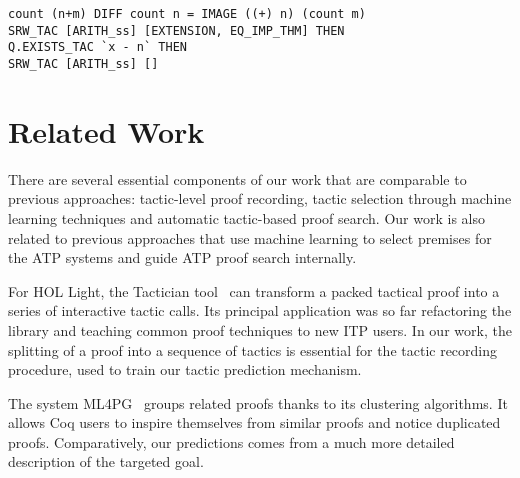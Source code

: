 \documentclass[runningheads,a4paper,draft]{svjour3}
\def\hollight{\textsf{HOL Light}\xspace}
\def\coq{\textsf{Coq}\xspace}
\def\holyhammer{\textsf{HOL(y)Hammer}\xspace}
\begin{document}
\begin{example}\label{ex:cs4}
\begin{lstlisting}[language=SMLSmall]
count (n+m) DIFF count n = IMAGE ((+) n) (count m)
SRW_TAC [ARITH_ss] [EXTENSION, EQ_IMP_THM] THEN
Q.EXISTS_TAC `x - n` THEN
SRW_TAC [ARITH_ss] []
\end{lstlisting}
\end{example}


\section{Related Work}
There are several essential components of our work that are comparable to
previous approaches: tactic-level proof recording, tactic
selection through machine learning techniques and automatic tactic-based proof
search. Our work is also related to previous approaches that use machine
learning to select premises for the ATP systems and guide ATP proof search
internally.

For \hollight, the Tactician tool~\cite{DBLP:conf/sefm/Adams15}
can transform a packed tactical proof into a series of interactive tactic
calls. Its principal application
was so far refactoring the library and teaching common proof techniques to new
ITP users. In our work, the splitting of a proof into a sequence of tactics is
essential for the
tactic recording procedure, used to train our tactic prediction mechanism.

The system
\textsf{ML4PG}~\cite{DBLP:journals/corr/abs-1212-3618,DBLP:journals/mics/HerasK14}
groups related proofs thanks to its clustering
algorithms. It allows \coq users to inspire themselves from similar proofs and
notice
duplicated proofs. Comparatively, our predictions comes from a much more
detailed description of the targeted goal.
\end{document}

